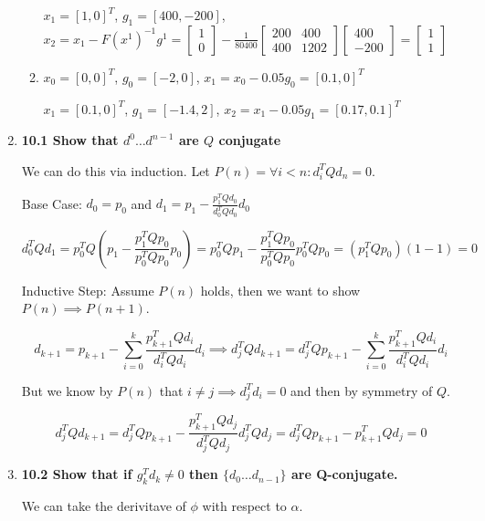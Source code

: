 \documentclass[10pt,a4paper]{article}
\begin{document}
\begin{enumerate}
\begin{enumerate}
        $x_1 = [1, 0]^T$, $g_1 = [400, -200]$, $x_2 = x_1 - F(x^1)^{-1} g^1  = \begin{bmatrix} 1\\ 0 \end{bmatrix} - \frac{1}{80400} \begin{bmatrix} 200 & 400 \\ 400 & 1202 \end{bmatrix} \begin{bmatrix} 400 \\ -200 \end{bmatrix} = \begin{bmatrix}1 \\1 \end{bmatrix}$
        \item $x_0 = [0, 0]^T$, $g_0 = [-2, 0]$, $x_1 = x_0 - 0.05 g_0 = [0.1, 0]^T$

        $x_1 = [0.1, 0]^T$, $g_1 = [-1.4, 2]$, $x_2 = x_1 - 0.05 g_1 = [0.17, 0.1]^T$

    \end{enumerate}

    \item \textbf{10.1 Show that $d^0 \dots d^{n-1}$ are $Q$ conjugate}
    
    We can do this via induction. Let $P(n) = \forall i < n : d_{i}^TQd_n = 0$.
   
    Base Case: $d_0 = p_0$ and $d_1 = p_1 - \frac{p_1^TQd_0}{d_0^TQd_0}d_0$

    $$d_0^TQd_1 = p_0^TQ(p_1 - \frac{p_1^TQp_0}{p_0^TQp_0}p_0) = p_0^TQp_1 - \frac{p_1^TQp_0}{p_0^TQp_0}p_0^TQp_0 = (p_1^TQp_0) (1-1) = 0$$

    Inductive Step: Assume $P(n)$ holds, then we want to show $P(n) \implies P(n+1)$.

    $$d_{k+1} = p_{k+1} - \sum_{i=0}^k \frac{p_{k+1}^TQd_i}{d_i^TQd_i}d_i \implies d_j^TQd_{k+1} = d_j^TQp_{k+1} - \sum_{i=0}^k \frac{p_{k+1}^TQd_i}{d_i^TQd_i}d_i$$

    But we know by $P(n)$ that $ i \neq j \implies d_j^Td_i = 0$ and then by symmetry of $Q$.

    $$d_j^TQd_{k+1} = d_j^TQp_{k+1} - \frac{p_{k+1}^TQd_j}{d_j^TQd_j}d_j^TQd_j = d_j^TQp_{k+1} - p_{k+1}^TQd_j = 0$$


    \item \textbf{10.2 Show that if $g_k^Td_k \neq 0$ then $\{ d_0 \ldots d_{n-1} \}$ are Q-conjugate.}
    
    We can take the derivitave of $\phi$ with respect to $\alpha$.


\end{enumerate}
\end{document}
